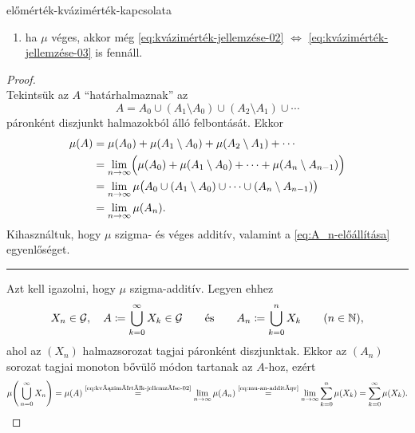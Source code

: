 \documentclass[
]{elteikthesis}[2024/04/26]
\begin{document}
\begin{theorem}{}{előmérték-kvázimérték-kapcsolata}
\begin{enumerate}
			\item ha \( \mu \) véges, akkor még 
			\ref{eq:kvázimérték-jellemzése-02} \( \Longleftrightarrow \)
			\ref{eq:kvázimérték-jellemzése-03} is fennáll.
		\end{enumerate}
	\end{theorem}
	\begin{proof}\,\\[1pt]
		\fbox{\ref{eq:kvázimérték-jellemzése-01} \( \Longrightarrow \)
			  \ref{eq:kvázimérték-jellemzése-02}}
		Tekintsük az \( A \) ``határhalmaznak'' az
		\[
			A = A_0 \cup (A_1 \setminus A_0) \cup (A_2 \setminus A_1) \cup \cdots
		\]
		páronként diszjunkt halmazokból álló felbontását. Ekkor
		\begin{align*}
			\mu(A)
			&= \mu(A_0) + \mu(A_1 \setminus A_0) + \mu(A_2 \setminus A_1) + \cdots \\
			&= \lim_{n \to \infty} \Bigl( 
			\mu(A_0) + \mu(A_1 \setminus A_0) + \cdots + \mu(A_n \setminus A_{n-1})
			\Bigr)\\
			&= \lim_{n \to \infty} \mu \bigl( 
			A_0 \cup (A_1 \setminus A_0) \cup \cdots \cup (A_n \setminus A_{n-1})
			\bigr) \\
			&= \lim_{n \to \infty} \mu (A_n).
		\end{align*}
		Kihasználtuk, hogy \( \mu \) szigma- és véges additív, 
		valamint a \eqref{eq:A_n-előállítása} egyenlőséget.
		
		\vspace{3pt}
		\hrule
		\vspace{6pt}
		
		\fbox{\ref{eq:kvázimérték-jellemzése-02} \( \Longrightarrow \)
			  \ref{eq:kvázimérték-jellemzése-01}}
		Azt kell igazolni, hogy \( \mu \) szigma-additív. Legyen ehhez
		\[
			X_n \in \mathcal{G}, \quad
			A \coloneq \bigcup_{k=0}^{\infty} X_k \in \mathcal{G} \qquad \text{és} \qquad
			A_n \coloneq \bigcup_{k=0}^{n} X_k \qquad (n \in \mathbb{N}),
		\]
		ahol az \( (X_n) \) halmazsorozat tagjai páronként diszjunktak. 
		Ekkor az \( (A_n) \) sorozat tagjai monoton bővülő módon tartanak az \( A \)-hoz,
		ezért
		\[
			\mu \Biggl( \, \bigcup_{n=0}^{\infty} X_n \Biggr) =
			\mu (A) \overset{\text{\ref{eq:kvázimérték-jellemzése-02}}}{=}
			\lim_{n \to \infty} \mu( A_n ) \overset{\text{\ref{eq:mu-an-additív}}}{=}
			\lim_{n \to \infty} \sum_{k=0}^{n} \mu( X_k ) =
			\sum_{k=0}^{\infty} \mu( X_k ).
		\]
		

\end{proof}
\end{document}
